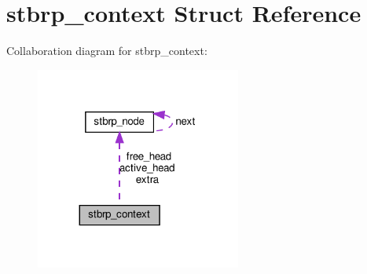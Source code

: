 \hypertarget{structstbrp__context}{}\section{stbrp\+\_\+context Struct Reference}
\label{structstbrp__context}


Collaboration diagram for stbrp\+\_\+context\+:\nopagebreak
\begin{figure}[H]
\begin{center}
\leavevmode
\includegraphics[width=191pt]{structstbrp__context__coll__graph}
\end{center}
\end{figure}
